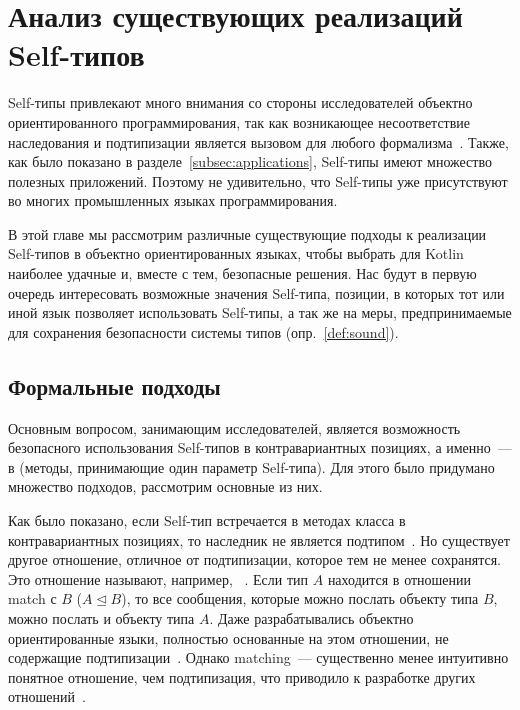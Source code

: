 \section{Анализ существующих реализаций Self-типов} \label{sec:impls}

Self-типы привлекают много внимания со стороны исследователей объектно ориентированного программирования, так как возникающее несоответствие наследования и подтипизации является вызовом для любого формализма~\cite{cook1989inheritance}.
Также, как было показано в разделе~\ref{subsec:applications}, Self-типы имеют множество полезных приложений.
Поэтому не удивительно, что Self-типы уже присутствуют во многих промышленных языках программирования.

В этой главе мы рассмотрим различные существующие подходы к реализации Self-типов в объектно ориентированных языках, чтобы выбрать для Kotlin наиболее удачные и, вместе с тем, безопасные решения.
Нас будут в первую очередь интересовать возможные значения Self-типа, позиции, в которых тот или иной язык позволяет использовать Self-типы, а так же на меры, предпринимаемые для сохранения безопасности системы типов (опр.~\ref{def:sound}).


\subsection{Формальные подходы} \label{subsec:formals}

Основным вопросом, занимающим исследователей, является возможность безопасного использования Self-типов в контравариантных позициях, а именно~--- в  (методы, принимающие один параметр Self-типа).
Для этого было придумано множество подходов, рассмотрим основные из них.

Как было показано, если Self-тип встречается в методах класса в контравариантных позициях, то наследник не является подтипом~\cite{cook1989inheritance}.
Но существует другое отношение, отличное от подтипизации, которое тем не менее сохранятся.
Это отношение называют, например, ~\cite{bruce1993safe}.
Если тип $A$ находится в отношении match с $B$ ($A \trianglelefteq B$), то все сообщения, которые можно послать объекту типа $B$, можно послать и объекту типа $A$.
Даже разрабатывались объектно ориентированные языки, полностью основанные на этом отношении, не содержащие подтипизации~\cite{bruce1997subtyping}.
Однако matching~--- существенно менее интуитивно понятное отношение, чем подтипизация, что приводило к разработке других отношений~\cite{ryu2016thistype}.

